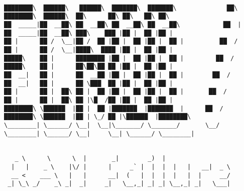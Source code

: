 \documentclass[varwidth=\maxdimen,margin=0.5cm,multi={verbatim}]{standalone}
\begin{document}
\begin{verbatim}

████████\  ██████\   ██████\  ███████\  ███████\              ██\       ████████\  ██████\  ██\      ██\ ██\   ██\ ██\
██  _____|██  __██\ ██  __██\ ██  __██\ ██  __██\            ██  |      ██  _____|██  __██\ ███\    ███ |██ |  ██ |██ |
██ |      ██ /  \__|██ /  ██ |██ |  ██ |██ |  ██ |          ██  /       ██ |      ██ /  \__|████\  ████ |██ |  ██ |██ |
█████\    ██ |      ████████ |██ |  ██ |██ |  ██ |         ██  /        █████\    ██ |      ██\██\██ ██ |██ |  ██ |██ |
██  __|   ██ |      ██  __██ |██ |  ██ |██ |  ██ |        ██  /         ██  __|   ██ |      ██ \███  ██ |██ |  ██ |██ |
██ |      ██ |  ██\ ██ |  ██ |██ |  ██ |██ |  ██ |       ██  /          ██ |      ██ |  ██\ ██ |\█  /██ |██ |  ██ |██ |
████████\ \██████  |██ |  ██ |███████  |███████  |      ██  /           ████████\ \██████  |██ | \_/ ██ |\██████  |████████\
\________| \______/ \__|  \__|\_______/ \_______/       \__/            \________| \______/ \__|     \__| \______/ \________|


   _ \      \      \  |       _|        _)  |
  |   |    _ \    |\/ |      |     _` |  |  |  |   |   __|  _ \
  __ <    ___ \   |   |      __|  (   |  |  |  |   |  |     __/
 _| \_\ _/    _\ _|  _|     _|   \__,_| _| _| \__,_| _|   \___|



\end{verbatim}
\end{document}
